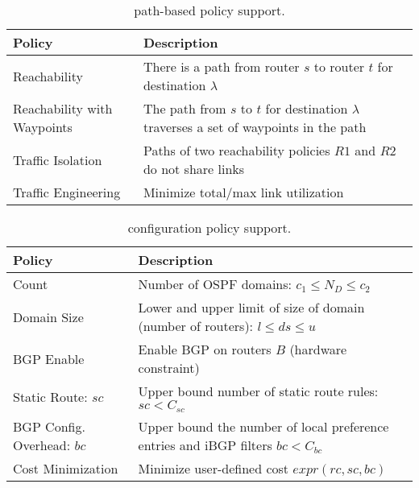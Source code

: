 \begin{table}
\begin{small}
	\begin{center}
		\begin{tabular}{m{7.8em}  m{15.9em} } 
			{\bf Policy} & {\bf Description} \\ 
			\hline
			Reachability & There is a path from router $s$ to router $t$ for destination $\lambda$ \\ \hline
			Reachability with \newline Waypoints & The path  from $s$ to $t$ for destination $\lambda$ 
			traverses a set of waypoints in the path\\ \hline
			Traffic Isolation & Paths of two reachability policies $R1$ and $R2$ do not share  links \\ \hline
			Traffic Engineering  & Minimize total/max link utilization \\
		\end{tabular}
	\end{center}
	\caption{\genesis path-based policy support.} \label{tab:policysupport} 
\end{small}
\end{table}
\begin{table}[!t]
	\begin{small}
		\begin{center}
			\begin{tabular}{m{6.5em}  m{17.7em} } 
				{\bf Policy} & {\bf Description} \\ 
				\hline
				Count  & Number of OSPF domains: $c_1\leq N_D\leq c_2$  \\ \hline
				Domain Size  & Lower and upper
				limit of size of domain (number of routers): $l\leq ds\leq u$ \\ \hline
				BGP \newline Enable & Enable BGP on routers $B$ (hardware constraint) \\ \hline
				Static Route: ${sc}$ & Upper bound number of static route rules: $sc < C_{sc}$ \\ \hline
				BGP Config. Overhead: $bc$ & Upper bound the number of local preference entries and iBGP filters $bc < C_{bc}$ \\ \hline
				Cost Minimization & Minimize user-defined cost $expr(rc, sc, bc)$
			\end{tabular}
		\end{center}
		\caption{\name configuration policy support.} \label{tab:configpolicysupport} 
	\end{small}
\end{table}